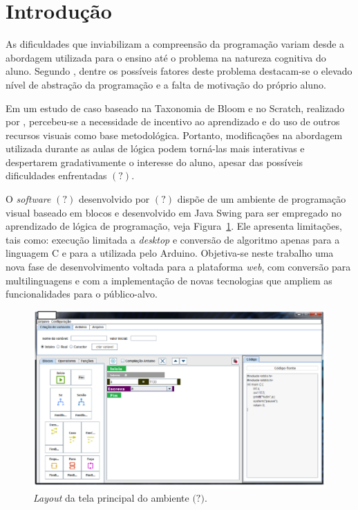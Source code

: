 \documentclass[12pt]{article}
\begin{document}
\section{Introdução} 
As dificuldades que inviabilizam a compreensão da programação variam desde a abordagem utilizada para o ensino até o problema na natureza cognitiva do aluno. Segundo \cite{GOMES:2008}, dentre os possíveis fatores deste problema destacam-se o elevado nível de abstração da programação e a falta de motivação do próprio aluno. 
\par Em um estudo de caso baseado na Taxonomia de Bloom e no Scratch, realizado por \cite{ARAUJO:2013}, percebeu-se a necessidade de incentivo ao aprendizado e do uso de outros recursos visuais como base metodológica. Portanto, modificações na abordagem utilizada durante as aulas de lógica podem torná-las mais interativas e despertarem gradativamente o interesse do aluno, apesar das possíveis dificuldades enfrentadas $(?)$.
\par O \textit{software} $(?)$ desenvolvido por $(?)$ dispõe de um ambiente de programação visual baseado em blocos e desenvolvido em Java Swing para ser empregado no aprendizado de lógica de programação, veja Figura~\ref{fig1}. Ele apresenta limitações, tais como: execução limitada a \textit{desktop} e conversão de algoritmo apenas para a linguagem C e para a utilizada pelo Arduino. Objetiva-se neste trabalho uma nova fase de desenvolvimento voltada para a plataforma \textit{web}, com conversão para multilinguagens e com a implementação de novas tecnologias que ampliem as funcionalidades para o público-alvo.
	\begin{figure}[h]
		\centering
		\includegraphics[scale=0.4]{2017.png}
		\caption{\textit{Layout} da tela principal do ambiente $\textbf{(?)}$.}
		\label{fig1}
	\end{figure}
	
\end{document}
